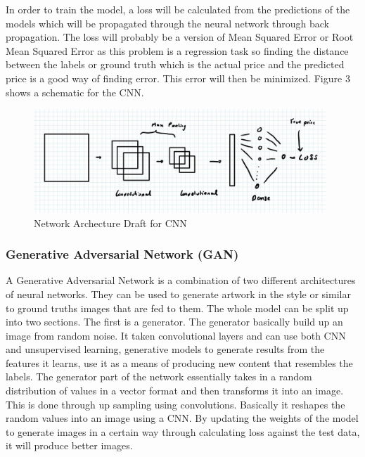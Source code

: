 \documentclass{article}
\begin{document}
In order to train the model, a loss will be calculated from the predictions of the models which will be propagated through the neural network through back propagation. The loss will probably be a version of Mean Squared Error or Root Mean Squared Error as this problem is a regression task so finding the distance between the labels or ground truth which is the actual price and the predicted price is a good way of finding error. This error will then be minimized. Figure 3 shows a schematic for the CNN. 


\begin{figure}[htp]
    \centering
    \includegraphics[width=11cm]{CONV.jpg}
    \caption{Network Archecture Draft for CNN}
    \label{fig:CNN}
\end{figure}

\subsubsection{Generative Adversarial Network (GAN)}

A Generative Adversarial Network is a combination of two different architectures of neural networks. They can be used to generate artwork in the style or similar to ground truths images that are fed to them. The whole model can be split up into two sections. The first is a generator. The generator basically build up an image from random noise. It taken convolutional layers and 
can use both CNN and unsupervised learning, generative models to generate results from the features it learns, use it as a means of producing new content that resembles the labels. The generator part of the network essentially takes in a random distribution of values in a vector format and then transforms it into an image. This is done through up sampling using convolutions. Basically it reshapes the random values into an image using a CNN. By updating the weights of the model to generate images in a certain way through calculating loss against the test data, it will produce better images. \newline   
\end{document}
